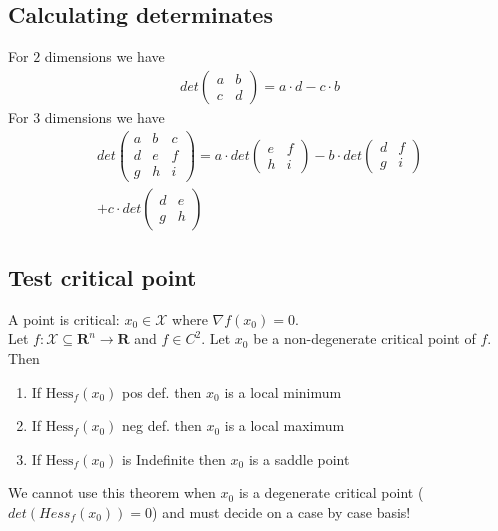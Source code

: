 \documentclass[8pt]{extarticle}
\newcommand{\R}{{\mathbb R}}
\newcommand{\X}{{\mathcal X}}
\newcommand{\ra}{{\rightarrow}}
\def\R{\mathbf{R}}
\begin{document}
\begin{multicols*}{3}
  \subsection{Calculating determinates}
  For $2$ dimensions we have
  \begin{align*}
    det
    \begin{pmatrix}
      a & b \\
      c & d
    \end{pmatrix}
    = a \cdot d - c \cdot b
  \end{align*}
  For $3$ dimensions we have
  \begin{align*}
    det
    \begin{pmatrix}
      a & b & c \\
      d & e & f \\
      g & h & i
    \end{pmatrix}
    = a \cdot det
    \begin{pmatrix}
      e & f \\
      h & i
    \end{pmatrix}
    - b \cdot det
    \begin{pmatrix}
      d & f \\
      g & i
    \end{pmatrix} \\
    + c \cdot det
    \begin{pmatrix}
      d & e \\
      g & h
    \end{pmatrix}
  \end{align*}
  \subsection{Test critical point}
  A point is critical: $x_0 \in \X$ where $\nabla f(x_0) = 0$. \\
  Let $f:\X \subseteq \R^n \ra \R$ and $f \in C^2$. Let $x_0$ be a
  non-degenerate critical point of $f$. Then
  \begin{enumerate}[label=(\arabic*)]
    \item If $\text{Hess}_f(x_0)$ pos def. then $x_0$ is a local minimum
    \item If $\text{Hess}_f(x_0)$ neg def. then $x_0$ is a local maximum
    \item If $\text{Hess}_f(x_0)$ is Indefinite then $x_0$
          is a saddle point
  \end{enumerate}
  We cannot use this theorem when $x_0$ is a degenerate critical
  point ($det(Hess_f(x_0)) = 0$) and must decide on a case by case basis!

\end{multicols*}
\end{document}

